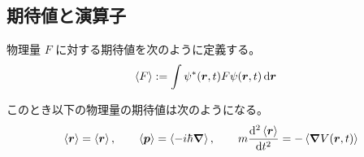 \documentclass[uplatex,dvipdfmx,a4paper,11pt]{jlreq}
\newcommand{\rr}{\bm{r}}
\newcommand{\pp}{\bm{p}}
\theoremstyle{definition}
\begin{document}
\subsection{期待値と演算子}
\begin{definition}
  物理量 $F$ に対する期待値を次のように定義する。
  \begin{align}
    \ev{F} & := \int\psi^*(\rr, t)F\psi(\rr, t)\dd{\rr}
  \end{align}
\end{definition}
\begin{theorem}
  このとき以下の物理量の期待値は次のようになる。
  \begin{align}
    \ev{\rr} = \ev{\rr}, \qquad \ev{\pp} = \ev{-i\hbar\vnabla}, \qquad m\dv[2]{\ev{\rr}}{t} = - \ev{\vnabla V(\rr, t)}
  \end{align}
\end{theorem}
\end{document}
